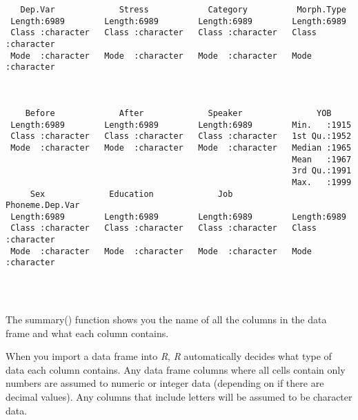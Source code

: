 \documentclass[
  10pt,
  letterpaper]{article}
\renewcommand\texttt[1]{{\ttfamily\color{BrickRed}#1}}
\begin{document}
\begin{verbatim}
   Dep.Var             Stress            Category          Morph.Type       
 Length:6989        Length:6989        Length:6989        Length:6989       
 Class :character   Class :character   Class :character   Class :character  
 Mode  :character   Mode  :character   Mode  :character   Mode  :character  
                                                                            
                                                                            
                                                                            
    Before             After             Speaker               YOB      
 Length:6989        Length:6989        Length:6989        Min.   :1915  
 Class :character   Class :character   Class :character   1st Qu.:1952  
 Mode  :character   Mode  :character   Mode  :character   Median :1965  
                                                          Mean   :1967  
                                                          3rd Qu.:1991  
                                                          Max.   :1999  
     Sex             Education             Job            Phoneme.Dep.Var   
 Length:6989        Length:6989        Length:6989        Length:6989       
 Class :character   Class :character   Class :character   Class :character  
 Mode  :character   Mode  :character   Mode  :character   Mode  :character  
                                                                            
                                                                            
                                                                            
\end{verbatim}

The \texttt{summary()} function shows you the name of all the columns in
the data frame and what each column contains.

When you import a data frame into \emph{R}, \emph{R} automatically
decides what type of data each column contains. Any data frame columns
where all cells contain only numbers are assumed to \texttt{numeric} or
\texttt{integer} data (depending on if there are decimal values). Any
columns that include letters will be assumed to be \texttt{character}
data.
\end{document}
